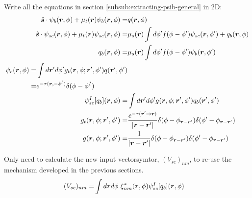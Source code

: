 \documentclass [10pt,letterpaper]{article}
\newcommand{\unitvectorsym}[1]{\hat{\vectorsym{#1}}}
\begin{document}
Write all the equations in section \ref{subsub:extracting-psib-general} in 2D:
\begin{subequations} \label{eq:def-psib-psisc-qb-psiscI-result-psib-exp-gf-gft}
	\begin{align}
		\unitvectorsym{s}
		\cdot 
		\psi_b(\vectorsym{r},\phi)
		+
		\mu_t(\vectorsym{r})
		\psi_b(\vectorsym{r},\phi)
		=&
		q(\vectorsym{r},\phi)
		\label{eq:def-psib-2d}
		\\
		\unitvectorsym{s}
		\cdot 
		\psi_{sc}(\vectorsym{r},\phi)
		+
		\mu_t(\vectorsym{r})
		\psi_{sc}(\vectorsym{r},\phi)
		=&
		\mu_s(\vectorsym{r})
		\int d\phi^\prime
		f(\phi-\phi^\prime)
		\psi_{sc}(\vectorsym{r},\phi^\prime)
		+
		q_b(\vectorsym{r},\phi)
		\label{eq:def-psisc-2d}
		\\
		q_b(\vectorsym{r},\phi)
		=&
		\mu_s(\vectorsym{r})
		\int d\phi^\prime
		f(\phi-\phi^\prime)
		\psi_b(\vectorsym{r},\phi^\prime) 
		\label{eq:def-qb-2d}
		\\
		\begin{split}
			\label{eq:result-psib-2d}
			\psi_b(\vectorsym{r},\phi)
			=&
			\int d\vectorsym{r}^\prime d\phi^\prime
			g_t(\vectorsym{r},\phi;\vectorsym{r}^\prime,\phi^\prime) 
			q(\vectorsym{r}^\prime,\phi^\prime)
			\\
			=&
			e^{-\tau(\vectorsym{r},-\unitvectorsym{s}^I)}
			\delta(\phi-\phi^I) 
		\end{split} 
		\\
		\psi_{sc}^I[q_b](\vectorsym{r},\phi)
		=&
		\int d\vectorsym{r}^\prime d\phi^\prime
		g(\vectorsym{r},\phi;\vectorsym{r}^\prime,\phi^\prime)
		q_b(\vectorsym{r}^\prime,\phi^\prime)
		\label{eq:def-psiscI-2d} 
		\\
		g_t(\vectorsym{r},\phi;\vectorsym{r}^\prime,\phi^\prime)
		=&
		\frac
		{e^{-\tau(\vectorsym{r}^\prime\to\vectorsym{r})}}
		{\lvert \vectorsym{r}-\vectorsym{r}^\prime \rvert}
		\delta(\phi-\phi_{\vectorsym{r}-\vectorsym{r}^\prime})
		\delta(\phi^\prime-\phi_{\vectorsym{r}-\vectorsym{r}^\prime})
		\label{eq:exp-gft-2d} 
		\\
		g(\vectorsym{r},\phi;\vectorsym{r}^\prime,\phi^\prime)
		=&
		\frac
		{1}
		{\lvert \vectorsym{r}-\vectorsym{r}^\prime \rvert}
		\delta(\phi-\phi_{\vectorsym{r}-\vectorsym{r}^\prime})
		\delta(\phi^\prime-\phi_{\vectorsym{r}-\vectorsym{r}^\prime})
		\label{eq:exp-gf-2d} 
	\end{align}
\end{subequations}

Only need to calculate the new input vectorsymtor, $(V_{sc})_{n m}$, to re-use the mechanism developed in the previous sections.
\begin{equation} \label{eq:def-Vscnm-1pt}
	\begin{split}
		(V_{sc})_{n m}
		=&
		\int d\vectorsym{r} d\phi
		\ \xi^*_{n m}
		(\vectorsym{r},\phi)
		\psi_{sc}^I
		[q_b]
		(\vectorsym{r},\phi) 
	\end{split}
\end{equation}
\end{document}
